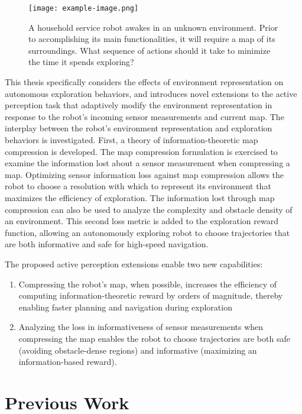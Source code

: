 \begin{figure}[t]
  \centering
  \texttt{[image: example-image.png]}
  \caption{A household service robot awakes in an unknown environment. Prior to
  accomplishing its main functionalities, it will require a map of its surroundings.
What sequence of actions should it take to minimize the time it spends
exploring? \label{fig:motivation}}
\end{figure}

This thesis specifically considers the effects of environment representation on
autonomous exploration behaviors, and introduces novel extensions to the active perception
task that adaptively modify the environment representation in response to
the robot's incoming sensor measurements and current map. The interplay between the robot's
environment representation and exploration behaviors is investigated. First, a theory of
information-theoretic map compression is developed. The map compression
formulation is exercised to examine the information lost about a sensor
measurement when compressing a map. Optimizing sensor information loss against
map compression allows the robot to choose a resolution with which to
represent its environment that maximizes the efficiency of exploration.
The information lost through map compression can also be used to analyze the
complexity and obstacle density of an environment. This second loss metric
is added to the exploration reward function, allowing an autonomously exploring
robot to choose trajectories that are both informative and safe for high-speed
navigation.

The proposed active perception extensions enable two new capabilities:

\begin{enumerate}
  \item Compressing the robot's map, when possible, increases the
    efficiency of computing information-theoretic reward by orders of magnitude, thereby
    enabling faster planning and navigation during exploration
  \item Analyzing the loss in informativeness of sensor measurements when
    compressing the map enables the robot to choose trajectories are both safe
    (avoiding obstacle-dense regions)
    and informative (maximizing an information-based reward).
\end{enumerate}

\section{Previous Work}

